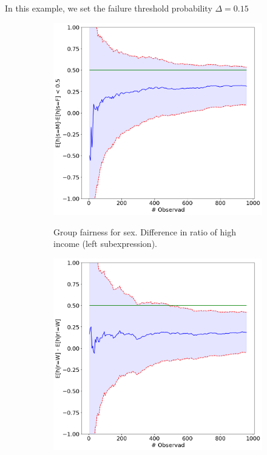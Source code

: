 In this example, we set the failure threshold probability $\Delta = 0.15$
\begin{figure}
    \centering
    \begin{subfigure}{0.6\linewidth}
    \includegraphics[width=\linewidth,alt={Confidence interval line plots showing group fainess differences for sex.}]{avoir/images/adult-left-initial.png}
    \caption{Group fairness for sex. Difference in ratio of high income (left subexpression).}
    \label{fig:casestudy:adult:specplot:left}
    \end{subfigure}
    \begin{subfigure}{0.6\linewidth}
    \centering
    \includegraphics[width=\linewidth,alt={Confidence interval line plots showing group fairness for race.}]{avoir/images/adult-right-initial.png}

\end{subfigure}
\end{figure}
